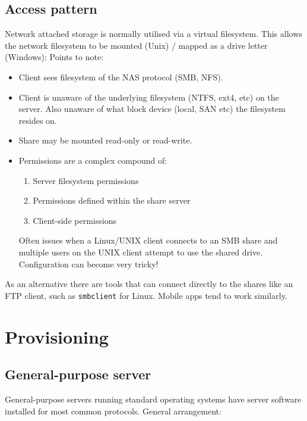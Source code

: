 \subsection{Access pattern}\label{access-pattern}

Network attached storage is normally utilised via a virtual filesystem.
This allows the network filesystem to be mounted (Unix) / mapped as a
drive letter (Windows): Points to note:

\begin{itemize}
\item
  Client sees filesystem of the NAS protocol (SMB, NFS).
\item
  Client is unaware of the underlying filesystem (NTFS, ext4, etc) on
  the server. Also unaware of what block device (local, SAN etc) the
  filesystem resides on.
\item
  Share may be mounted read-only or read-write.
\item
  Permissions are a complex compound of:

  \begin{enumerate}
  \def\labelenumi{\arabic{enumi}.}
  \item
    Server filesystem permissions
  \item
    Permissions defined within the share server
  \item
    Client-side permissions
  \end{enumerate}

  Often issues when a Linux/UNIX client connects to an SMB share and
  multiple users on the UNIX client attempt to use the shared drive.
  Configuration can become very tricky!
\end{itemize}

As an alternative there are tools that can connect directly to the
shares like an FTP client, such as \texttt{smbclient} for Linux. Mobile
apps tend to work similarly.

\section{Provisioning}\label{provisioning}

\subsection{General-purpose server}\label{general-purpose-server}

General-purpose servers running standard operating systems have server
software installed for most common protocols. General arrangement:

